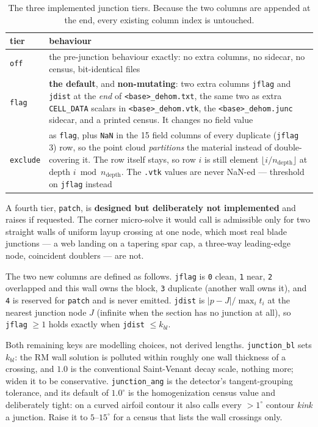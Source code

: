 \begin{table}[htbp]
\centering
\small
\begin{tabular}{lp{10.5cm}}
\toprule
tier & behaviour \\
\midrule
\texttt{off} & the pre-junction behaviour exactly: no extra columns, no
  sidecar, no census, bit-identical files \\
\texttt{flag} & \textbf{the default}, and \textbf{non-mutating}: two extra
  columns \texttt{jflag} and \texttt{jdist} at the \emph{end} of
  \texttt{<base>\_dehom.txt}, the same two as extra \texttt{CELL\_DATA} scalars
  in \texttt{<base>\_dehom.vtk}, the \texttt{<base>\_dehom.junc} sidecar, and a
  printed census. It changes no field value \\
\texttt{exclude} & as \texttt{flag}, plus \texttt{NaN} in the 15 field columns
  of every duplicate (\texttt{jflag} 3) row, so the point cloud
  \emph{partitions} the material instead of double-covering it. The row itself
  stays, so row $i$ is still element $\lfloor i/n_{\mathrm{depth}}\rfloor$ at
  depth $i \bmod n_{\mathrm{depth}}$. The \texttt{.vtk} values are never
  NaN-ed --- threshold on \texttt{jflag} instead \\
\bottomrule
\end{tabular}
\caption{The three implemented junction tiers. Because the two columns are
appended at the end, every existing column index is untouched.}
\label{tab:shell-junction-tiers}
\end{table}

A fourth tier, \texttt{patch}, is \textbf{designed but deliberately not
implemented} and raises if requested. The corner micro-solve it would call is
admissible only for two straight walls of uniform layup crossing at one node,
which most real blade junctions --- a web landing on a tapering spar cap, a
three-way leading-edge node, coincident doublers --- are not.

The two new columns are defined as follows. \texttt{jflag} is \texttt{0} clean,
\texttt{1} near, \texttt{2} overlapped and this wall owns the block, \texttt{3}
duplicate (another wall owns it), and \texttt{4} is reserved for \texttt{patch}
and is never emitted. \texttt{jdist} is $|p - J| / \max_i t_i$ at the nearest
junction node $J$ (infinite when the section has no junction at all), so
\texttt{jflag} $\ge 1$ holds exactly when \texttt{jdist} $\le k_{bl}$.

Both remaining keys are modelling choices, not derived lengths.
\texttt{junction\_bl} sets $k_{bl}$: the RM wall solution is polluted within
roughly one wall thickness of a crossing, and $1.0$ is the conventional
Saint-Venant decay scale, nothing more; widen it to be conservative.
\texttt{junction\_ang} is the detector's tangent-grouping tolerance, and its
default of $1.0^\circ$ is the homogenization census value and deliberately
tight: on a curved airfoil contour it also calls every ${>}1^\circ$ contour
\emph{kink} a junction. Raise it to $5$--$15^\circ$ for a census that lists the
wall crossings only.

